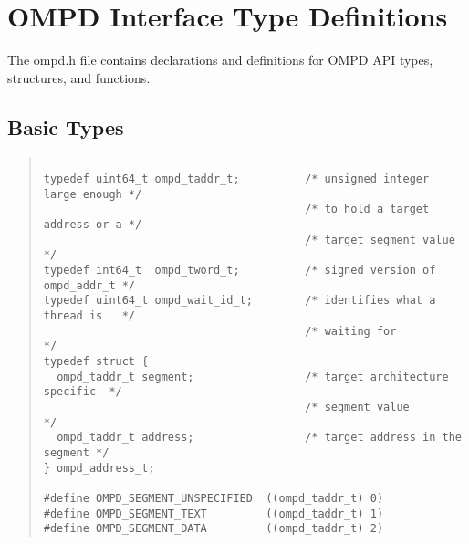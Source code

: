 \section{OMPD Interface Type Definitions}
\label{appendix:ompd-types}

The ompd.h file contains declarations and definitions for OMPD API
types, structures, and functions.

\subsection{Basic Types}

\begin{quote}
\begin{lstlisting}

typedef uint64_t ompd_taddr_t;          /* unsigned integer large enough */
                                        /* to hold a target address or a */
                                        /* target segment value          */
typedef int64_t  ompd_tword_t;          /* signed version of ompd_addr_t */
typedef uint64_t ompd_wait_id_t;        /* identifies what a thread is   */
                                        /* waiting for                   */
typedef struct {
  ompd_taddr_t segment;                 /* target architecture specific  */
                                        /* segment value                 */
  ompd_taddr_t address;                 /* target address in the segment */
} ompd_address_t;

#define OMPD_SEGMENT_UNSPECIFIED  ((ompd_taddr_t) 0)
#define OMPD_SEGMENT_TEXT         ((ompd_taddr_t) 1)
#define OMPD_SEGMENT_DATA         ((ompd_taddr_t) 2)

\end{lstlisting}
\end{quote}

